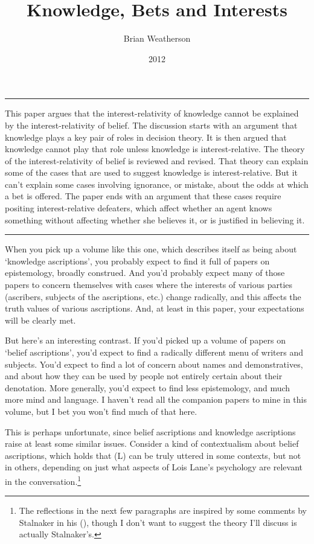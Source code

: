 \documentclass[
  10pt,
  letterpaper,
  DIV=11,
  numbers=noendperiod,
  twoside]{scrartcl}
\title{Knowledge, Bets and Interests}
\author{Brian Weatherson}
\date{2012}
\renewenvironment{abstract}
 {\vspace{-1.25cm}
 \quotation\small\noindent\rule{\linewidth}{.5pt}\par\smallskip
 \noindent }
 {\par\noindent\rule{\linewidth}{.5pt}\endquotation}
\begin{document}
\maketitle
\begin{abstract}
This paper argues that the interest-relativity of knowledge cannot be
explained by the interest-relativity of belief. The discussion starts
with an argument that knowledge plays a key pair of roles in decision
theory. It is then argued that knowledge cannot play that role unless
knowledge is interest-relative. The theory of the interest-relativity of
belief is reviewed and revised. That theory can explain some of the
cases that are used to suggest knowledge is interest-relative. But it
can't explain some cases involving ignorance, or mistake, about the odds
at which a bet is offered. The paper ends with an argument that these
cases require positing interest-relative defeaters, which affect whether
an agent knows something without affecting whether she believes it, or
is justified in believing it.
\end{abstract}


When you pick up a volume like this one, which describes itself as being
about `knowledge ascriptions', you probably expect to find it full of
papers on epistemology, broadly construed. And you'd probably expect
many of those papers to concern themselves with cases where the
interests of various parties (ascribers, subjects of the ascriptions,
etc.) change radically, and this affects the truth values of various
ascriptions. And, at least in this paper, your expectations will be
clearly met.

But here's an interesting contrast. If you'd picked up a volume of
papers on `belief ascriptions', you'd expect to find a radically
different menu of writers and subjects. You'd expect to find a lot of
concern about names and demonstratives, and about how they can be used
by people not entirely certain about their denotation. More generally,
you'd expect to find less epistemology, and much more mind and language.
I haven't read all the companion papers to mine in this volume, but I
bet you won't find much of that here.

This is perhaps unfortunate, since belief ascriptions and knowledge
ascriptions raise at least some similar issues. Consider a kind of
contextualism about belief ascriptions, which holds that (L) can be
truly uttered in some contexts, but not in others, depending on just
what aspects of Lois Lane's psychology are relevant in the
conversation.\footnote{The reflections in the next few paragraphs are
  inspired by some comments by Stalnaker in his
  (), though I don't want to suggest
  the theory I'll discuss is actually Stalnaker's.}
\end{document}
